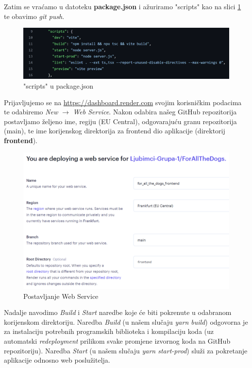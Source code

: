 			Zatim se vraćamo u datoteku \textbf{package.json} i ažuriramo "scripts" kao na slici \ref{scripts} te obavimo \textit{git push}.
			
			\begin{figure}[H]
				\includegraphics[scale=0.4]{slike/scripts.PNG} 
				\centering
				\caption{"scripts" u package.json}
				\label{scripts}
			\end{figure}
			
			Prijavljujemo se na \url{https://dashboard.render.com} svojim korisničkim podacima te odabiremo \textit{New} $\rightarrow$ \textit{Web Service}. Nakon odabira našeg GitHub repozitorija postavljamo željeno ime, regiju (EU Central), odgovarajuću granu repozitorija (main), te ime korijenskog direktorija za frontend dio aplikacije (direktorij \textbf{frontend}).
			
			\begin{figure}[H]
				\includegraphics[scale=0.6]{slike/frontend_1.PNG} 
				\centering
				\caption{Postavljanje Web Service}
				\label{frontend_1}
			\end{figure}
			
			Nadalje navodimo \textit{Build} i \textit{Start} naredbe koje će biti pokrenute u odabranom korijenskom direktoriju. Naredba \textit{Build} (u našem slučaju \textit{yarn build}) odgovorna je za instalaciju potrebnih programskih biblioteka i kompilaciju koda (uz automatski \textit{redeployment} prilikom svake promjene izvornog koda na GitHub repozitoriju). Naredba \textit{Start} (u našem slučaju \textit{yarn start-prod}) služi za pokretanje aplikacije odnosno web poslužitelja.
			
